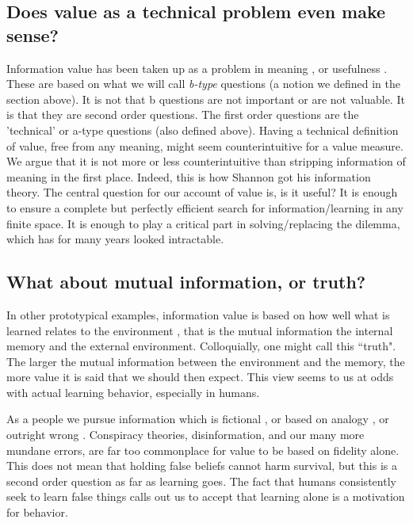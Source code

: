 \subsection*{Does value as a technical problem even make sense?}
Information value has been taken up as a problem in meaning  \citep{Kolchinsky2018}, or usefulness \citep{Tishby2000}. These are based on what we will call \textit{b-type} questions (a notion we defined in the section above). It is not that b questions are not important or are not valuable. It is that they are second order questions. The first order questions are the 'technical' or a-type questions (also defined above). 
Having a technical definition of value, free from any meaning, might seem counterintuitive for a value measure. We argue that it is not more or less counterintuitive than stripping information of meaning in the first  place. Indeed, this is how Shannon got his information theory. The central question for our account of value is, is it useful? It is enough to ensure a complete but perfectly efficient search for information/learning in any finite space. It is enough to play a critical part in solving/replacing the dilemma, which has for many years looked intractable. 


\subsection*{What about mutual information, or truth?}
In other prototypical examples, information value is based on how well what is learned relates to the environment \citep{Behrens2007,Kolchinsky2018,Tishby2000}, that is the mutual information the internal memory and the external environment. Colloquially, one might call this ``truth". The larger the mutual information between the environment and the memory, the more value it is said that we should then expect. This view seems to us at odds with actual learning behavior, especially in humans. 

As a people we pursue information which is fictional \citep{sternisko2020dark}, or based on analogy \citep{gentner1997reasoning}, or outright wrong \citep{loftus1989misinformation}. Conspiracy theories, disinformation, and our many more mundane errors, are far too commonplace for value to be based on fidelity alone. This does not mean that holding false beliefs cannot harm survival, but this is a second order question as far as learning goes. The fact that humans consistently seek to learn false things calls out us to accept that learning alone is a motivation for behavior.

